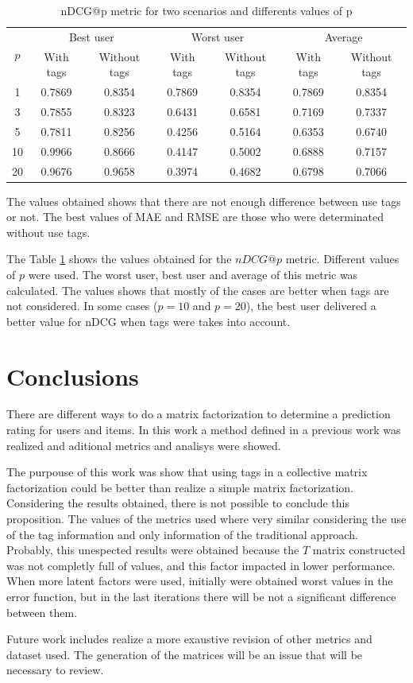 \documentclass{sig-alternate}
\begin{document}
\begin{table}
\centering
\caption{nDCG@p metric for two scenarios and differents values of p}
\begin{tabular}{|c|c|c|c|c|c|c|}
\hline
\multirow{2}{*}{$p$} & \multicolumn{2}{|c|}{Best user} & \multicolumn{2}{|c|}{Worst user} & \multicolumn{2}{|c|}{Average} \\ \cline{2-7}
 & With tags & Without tags & With tags & Without tags & With tags & Without tags \\ \hline \hline
1 & 0.7869 & 0.8354 & 0.7869 & 0.8354 & 0.7869 & 0.8354 \\ \hline
3 & 0.7855 & 0.8323 & 0.6431 & 0.6581 & 0.7169 & 0.7337\\ \hline
5 & 0.7811 & 0.8256 & 0.4256 & 0.5164 & 0.6353 & 0.6740\\ \hline
10 & 0.9966 & 0.8666 & 0.4147 & 0.5002 & 0.6888 & 0.7157\\ \hline
20 & 0.9676 & 0.9658 & 0.3974 & 0.4682 & 0.6798 & 0.7066\\ \hline
\end{tabular}
\label{tab:ndcg}
\end{table}

The values obtained shows that there are not enough difference between use tags or not. The best values of MAE and RMSE are those who were determinated without use tags.

The Table \ref{tab:ndcg} shows the values obtained for the $nDCG@p$ metric. Different values of $p$ were used. The worst user, best user and average of this metric was calculated. The values shows that mostly of the cases are better when tags are not considered. In some cases ($p=10$ and $p=20$), the best user delivered a better value for nDCG when tags were takes into account.

\section{Conclusions}
There are different ways to do a matrix factorization to determine a prediction rating for users and items. In this work a method defined in a previous work was realized and aditional metrics and analisys were showed. 

The purpouse of this work was show that using tags in a collective matrix factorization could be better than realize a simple matrix factorization. Considering the results obtained, there is not possible to conclude this proposition. The values of the metrics used where very similar considering the use of the tag information and only information of the traditional approach. Probably, this unespected results were obtained because the $T$ matrix constructed was not completly full of values, and this factor impacted in lower performance. When more latent factors were used, initially were obtained worst values in the error function, but in the last iterations there will be not a significant difference between them.  

Future work includes realize a more exaustive revision of other metrics and dataset used. The generation of the matrices will be an issue that will be necessary to review.


\end{document}
